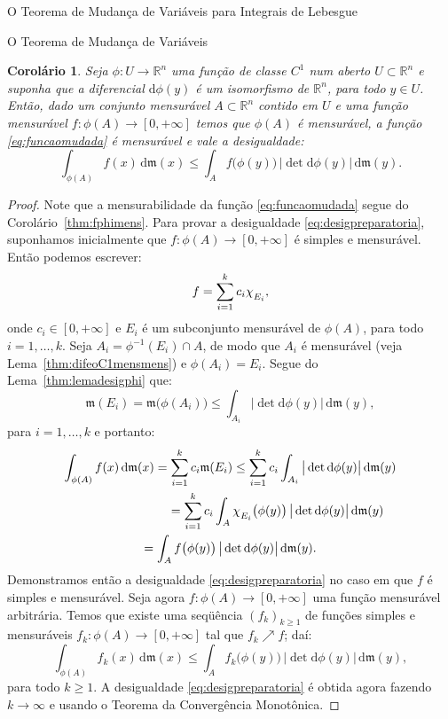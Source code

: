 \documentclass[oneside,final,11pt]{amsbook}
\newcommand{\R}{\mathds R}
\newcommand{\leb}{\mathfrak m}
\newcommand{\dd}{\mathrm d}
\newcommand{\chilow}[1]{\chi_{\lower2pt\hbox{$\scriptstyle#1$}}}
\theoremstyle{remark}\newtheorem{exercise}{Exercício}[chapter]
\theoremstyle{remark}\newtheorem{*exercise}[exercise]{\hbox to 0pt{\hskip 0pt minus 1fil*}Exercício}
\theoremstyle{definition}\newtheorem{exdefin}{Definição}[chapter]
\theoremstyle{plain}\newtheorem{teo}{Teorema}[section]
\theoremstyle{plain}\newtheorem{lem}[teo]{Lema}
\theoremstyle{plain}\newtheorem{prop}[teo]{Proposição}
\theoremstyle{plain}\newtheorem{cor}[teo]{Corolário}
\theoremstyle{definition}\newtheorem{defin}[teo]{Definição}
\theoremstyle{remark}\newtheorem{rem}[teo]{Observação}
\theoremstyle{definition}\newtheorem{notation}[teo]{Notação}
\theoremstyle{definition}\newtheorem{convention}[teo]{Convenção}
\theoremstyle{definition}\newtheorem{example}[teo]{Exemplo}
\numberwithin{section}{chapter}
\numberwithin{equation}{section}
\begin{document}
\begin{chapter}{O Teorema de Mudança de Variáveis para Integrais de Lebesgue}
\begin{section}{O Teorema de Mudança de Variáveis}
\begin{cor}\label{thm:desigpreparatoria}
Seja $\phi:U\to\R^n$ uma função de classe $C^1$ num aberto $U\subset\R^n$ e suponha que a diferencial
$\dd\phi(y)$ é um isomorfismo de $\R^n$, para todo $y\in U$. Então, dado um conjunto mensurável $A\subset\R^n$
contido em $U$ e uma função mensurável $f:\phi(A)\to[0,+\infty]$ temos que $\phi(A)$ é mensurável,
a função \eqref{eq:funcaomudada} é mensurável e vale a desigualdade:
\begin{equation}\label{eq:desigpreparatoria}
\int_{\phi(A)}f(x)\,\dd\leb(x)\le\int_Af\big(\phi(y)\big)\,\big\vert\det\dd\phi(y)\big\vert\,\dd\leb(y).
\end{equation}
\end{cor}
\begin{proof}
Note que a mensurabilidade da função \eqref{eq:funcaomudada} segue do Corolário~\ref{thm:fphimens}.
Para provar a desigualdade \eqref{eq:desigpreparatoria},
suponhamos inicialmente que $f:\phi(A)\to[0,+\infty]$ é simples e mensurável. Então podemos escrever:
\[f=\sum_{i=1}^kc_i\chilow{E_i},\]
onde $c_i\in[0,+\infty]$ e $E_i$ é um subconjunto mensurável de $\phi(A)$, para todo $i=1,\ldots,k$.
Seja $A_i=\phi^{-1}(E_i)\cap A$, de modo que $A_i$ é mensurável (veja Lema~\ref{thm:difeoC1mensmens}) e $\phi(A_i)=E_i$.
Segue do Lema~\ref{thm:lemadesigphi} que:
\[\leb(E_i)=\leb\big(\phi(A_i)\big)\le\int_{A_i}\big\vert\det\dd\phi(y)\big\vert\,\dd\leb(y),\]
para $i=1,\ldots,k$ e portanto:
\begin{multline*}
\int_{\phi(A)}f(x)\,\dd\leb(x)=\sum_{i=1}^kc_i\leb(E_i)\le
\sum_{i=1}^kc_i\int_{A_i}\big\vert\det\dd\phi(y)\big\vert\,\dd\leb(y)\\
\shoveright{=\sum_{i=1}^kc_i\int_A\chilow{E_i}\big(\phi(y)\big)\,\big\vert\det\dd\phi(y)\big\vert\,\dd\leb(y)}\\
=\int_Af\big(\phi(y)\big)\,\big\vert\det\dd\phi(y)\big\vert\,\dd\leb(y).
\end{multline*}
Demonstramos então a desigualdade \eqref{eq:desigpreparatoria} no caso em que $f$ é simples
e mensurável. Seja agora $f:\phi(A)\to[0,+\infty]$ uma função mensurável arbitrária.
Temos que existe uma seqüência $(f_k)_{k\ge1}$ de funções simples e mensuráveis
$f_k:\phi(A)\to[0,+\infty]$ tal que $f_k\nearrow f$; daí:
\[\int_{\phi(A)}f_k(x)\,\dd\leb(x)\le\int_Af_k\big(\phi(y)\big)\,\big\vert\det\dd\phi(y)\big\vert\,\dd\leb(y),\]
para todo $k\ge1$. A desigualdade \eqref{eq:desigpreparatoria} é obtida agora fazendo
$k\to\infty$ e usando o Teorema da Convergência Monotônica.
\end{proof}


\end{section}
\end{chapter}
\end{document}

